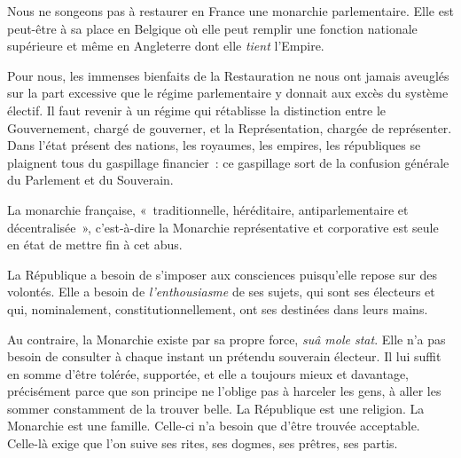 \documentclass[french,twoside]{book} %
\newcommand{\astermono}{\medskip\centerline{\color{rubric}\large\selectfont{\syms ✻}}\medskip\par}%
\begin{document}
\astermono

\noindent Nous ne songeons pas à restaurer en France une monarchie parlementaire. Elle est peut-être à sa place en Belgique où elle peut remplir une fonction nationale supérieure et même en Angleterre dont elle \emph{tient} l’Empire.\par
Pour nous, les immenses bienfaits de la Restauration ne nous ont jamais aveuglés sur la part excessive que le régime parlementaire y donnait aux excès du système électif. Il faut revenir à un régime qui rétablisse la distinction entre le Gouvernement, chargé de gouverner, et la Représentation, chargée de représenter. Dans l’état présent des nations, les royaumes, les empires, les républiques se plaignent tous du gaspillage financier : ce gaspillage sort de la confusion générale du Parlement et du Souverain.\par
La monarchie française, « traditionnelle, héréditaire, antiparlementaire et décentralisée », c’est-à-dire la Monarchie représentative et corporative est seule en état de mettre fin à cet abus.\par

\astermono

\noindent La République a besoin de s’imposer aux consciences puisqu’elle repose sur des volontés. Elle a besoin de \emph{l’enthousiasme} de ses sujets, qui sont ses électeurs et qui, nominalement, constitutionnellement, ont ses destinées dans leurs mains.\par
Au contraire, la Monarchie existe par sa propre force, \emph{suâ mole stat}. Elle n’a pas besoin de consulter à chaque instant un prétendu souverain électeur. Il lui suffit en somme d’être tolérée, supportée, et elle a toujours mieux et davantage, précisément parce que son principe ne l’oblige pas à harceler les gens, à aller les sommer constamment de la trouver belle. La République est une religion. La Monarchie est une famille. Celle-ci n’a besoin que d’être trouvée acceptable. Celle-là exige que l’on suive ses rites, ses dogmes, ses prêtres, ses partis.\par

\astermono
\end{document}
